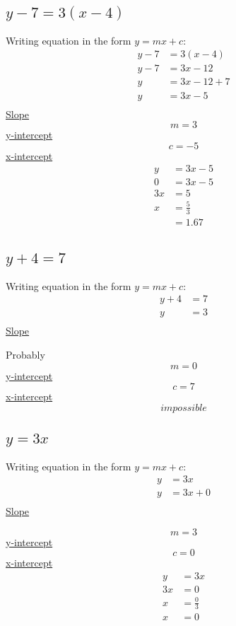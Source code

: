\documentclass{article}
\begin{document}
\subsection{$y-7=3(x-4)$}
Writing equation in the form $y=mx+c$:
$$
    \begin{aligned}
        y-7 & = 3(x-4)   \\
        y-7 & = 3x-12    \\
        y   & = 3x-12 +7 \\
        y   & = 3x-5     \\
    \end{aligned}
$$
\underline{Slope}
$$
    m=3
$$
\underline{y-intercept}
$$
    c = -5
$$
\underline{x-intercept}
$$
    \begin{aligned}
        y  & = 3x-5        \\
        0  & = 3x-5        \\
        3x & = 5           \\
        x  & = \frac{5}{3} \\
           & =1.67         \\
    \end{aligned}
$$
\subsection{$y+4=7$}
Writing equation in the form $y=mx+c$:
$$
    \begin{aligned}
        y+4 & =7 \\
        y   & =3 \\
    \end{aligned}
$$
\underline{Slope}

Probably
$$
    m=0
$$
\underline{y-intercept}
$$
    c = 7
$$
\underline{x-intercept}
$$
    impossible
$$
\subsection{$y=3x$}
Writing equation in the form $y=mx+c$:
$$
    \begin{aligned}
        y & = 3x   \\
        y & = 3x+0 \\
    \end{aligned}
$$
\underline{Slope}

$$
    m=3
$$
\underline{y-intercept}
$$
    c = 0
$$
\underline{x-intercept}
$$
    \begin{aligned}
        y  & = 3x          \\
        3x & = 0           \\
        x  & = \frac{0}{3} \\
        x  & = 0           \\
    \end{aligned}
$$
\end{document}
